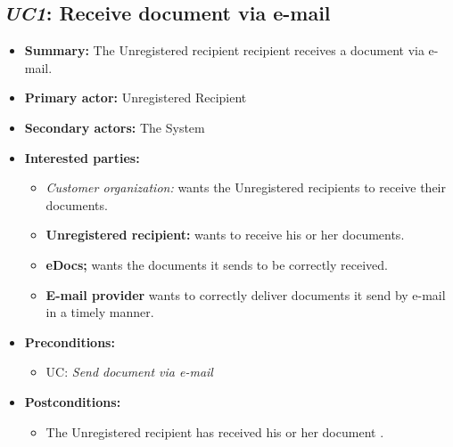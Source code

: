 \documentclass[a4paper,10pt]{article}
\begin{document}
\subsection{\emph{UC1}: Receive document via e-mail}
\begin{itemize}
    \item \textbf{Summary:} The Unregistered recipient recipient receives a document via e-mail.
    \item \textbf{Primary actor:} Unregistered Recipient
	\item \textbf{Secondary actors:} The System
    \item \textbf{Interested parties:} 
        \begin{itemize}
            \item \textit{Customer organization:} wants the Unregistered recipients to receive their documents.
            \item \textbf{Unregistered recipient:} wants to receive his or her documents.
            \item \textbf{eDocs;} wants the documents it sends to be correctly received.
            \item \textbf{E-mail provider} wants to correctly deliver documents it send by e-mail in a timely manner.
        \end{itemize}

    \item \textbf{Preconditions:}
        \begin{itemize}
            \item UC: \emph{Send document via e-mail}
        \end{itemize}

    \item \textbf{Postconditions:}
        \begin{itemize}
            \item The Unregistered recipient has received his or her document .
        \end{itemize}
        

\end{itemize}
\end{document}
